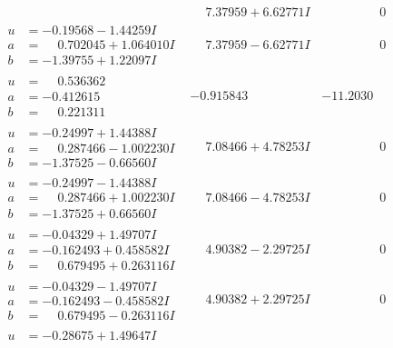 \documentclass[1p]{elsarticle_modified}
\theoremstyle{definition}
\begin{document}
$$\begin{array}{c|c|c}
 & \phantom{-}7.37959 + 6.62771 I & \phantom{-0.000000 } 0 \\ \hline\begin{aligned}
u &= -0.19568 - 1.44259 I \\
a &= \phantom{-}0.702045 + 1.064010 I \\
b &= -1.39755 + 1.22097 I\end{aligned}
 & \phantom{-}7.37959 - 6.62771 I & \phantom{-0.000000 } 0 \\ \hline\begin{aligned}
u &= \phantom{-}0.536362\phantom{ +0.000000I} \\
a &= -0.412615\phantom{ +0.000000I} \\
b &= \phantom{-}0.221311\phantom{ +0.000000I}\end{aligned}
 & -0.915843\phantom{ +0.000000I} & -11.2030\phantom{ +0.000000I} \\ \hline\begin{aligned}
u &= -0.24997 + 1.44388 I \\
a &= \phantom{-}0.287466 - 1.002230 I \\
b &= -1.37525 - 0.66560 I\end{aligned}
 & \phantom{-}7.08466 + 4.78253 I & \phantom{-0.000000 } 0 \\ \hline\begin{aligned}
u &= -0.24997 - 1.44388 I \\
a &= \phantom{-}0.287466 + 1.002230 I \\
b &= -1.37525 + 0.66560 I\end{aligned}
 & \phantom{-}7.08466 - 4.78253 I & \phantom{-0.000000 } 0 \\ \hline\begin{aligned}
u &= -0.04329 + 1.49707 I \\
a &= -0.162493 + 0.458582 I \\
b &= \phantom{-}0.679495 + 0.263116 I\end{aligned}
 & \phantom{-}4.90382 - 2.29725 I & \phantom{-0.000000 } 0 \\ \hline\begin{aligned}
u &= -0.04329 - 1.49707 I \\
a &= -0.162493 - 0.458582 I \\
b &= \phantom{-}0.679495 - 0.263116 I\end{aligned}
 & \phantom{-}4.90382 + 2.29725 I & \phantom{-0.000000 } 0 \\ \hline\begin{aligned}
u &= -0.28675 + 1.49647 I \\

\end{aligned}
\end{array}$$
\end{document}
